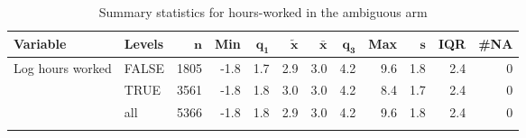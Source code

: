 {\footnotesize
\begin{longtable}{llrrrrrrrrrr}
\caption{Summary statistics for hours-worked in the ambiguous arm} \\ 
 \textbf{Variable} & \textbf{Levels} & $\mathbf{n}$ & \textbf{Min} & $\mathbf{q_1}$ & $\mathbf{\widetilde{x}}$ & $\mathbf{\bar{x}}$ & $\mathbf{q_3}$ & \textbf{Max} & $\mathbf{s}$ & \textbf{IQR} & \textbf{\#NA} \\ 
  \hline
Log hours worked & FALSE & 1805 & -1.8 & 1.7 & 2.9 & 3.0 & 4.2 & 9.6 & 1.8 & 2.4 & 0 \\ 
   & TRUE & 3561 & -1.8 & 1.8 & 3.0 & 3.0 & 4.2 & 8.4 & 1.7 & 2.4 & 0 \\ 
   \hline
 & all & 5366 & -1.8 & 1.8 & 2.9 & 3.0 & 4.2 & 9.6 & 1.8 & 2.4 & 0 \\ 
   \hline
\hline
\label{}
\end{longtable}
}
